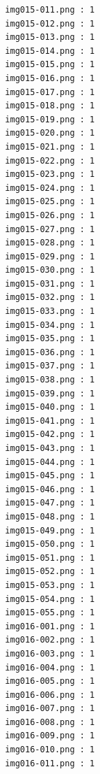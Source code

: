 \documentclass[12pt,a4paper]{article}
\begin{document}
\begin{lstlisting}
                     img015-011.png : 1
                     img015-012.png : 1
                     img015-013.png : 1
                     img015-014.png : 1
                     img015-015.png : 1
                     img015-016.png : 1
                     img015-017.png : 1
                     img015-018.png : 1
                     img015-019.png : 1
                     img015-020.png : 1
                     img015-021.png : 1
                     img015-022.png : 1
                     img015-023.png : 1
                     img015-024.png : 1
                     img015-025.png : 1
                     img015-026.png : 1
                     img015-027.png : 1
                     img015-028.png : 1
                     img015-029.png : 1
                     img015-030.png : 1
                     img015-031.png : 1
                     img015-032.png : 1
                     img015-033.png : 1
                     img015-034.png : 1
                     img015-035.png : 1
                     img015-036.png : 1
                     img015-037.png : 1
                     img015-038.png : 1
                     img015-039.png : 1
                     img015-040.png : 1
                     img015-041.png : 1
                     img015-042.png : 1
                     img015-043.png : 1
                     img015-044.png : 1
                     img015-045.png : 1
                     img015-046.png : 1
                     img015-047.png : 1
                     img015-048.png : 1
                     img015-049.png : 1
                     img015-050.png : 1
                     img015-051.png : 1
                     img015-052.png : 1
                     img015-053.png : 1
                     img015-054.png : 1
                     img015-055.png : 1
                     img016-001.png : 1
                     img016-002.png : 1
                     img016-003.png : 1
                     img016-004.png : 1
                     img016-005.png : 1
                     img016-006.png : 1
                     img016-007.png : 1
                     img016-008.png : 1
                     img016-009.png : 1
                     img016-010.png : 1
                     img016-011.png : 1




\end{lstlisting}
\end{document}

